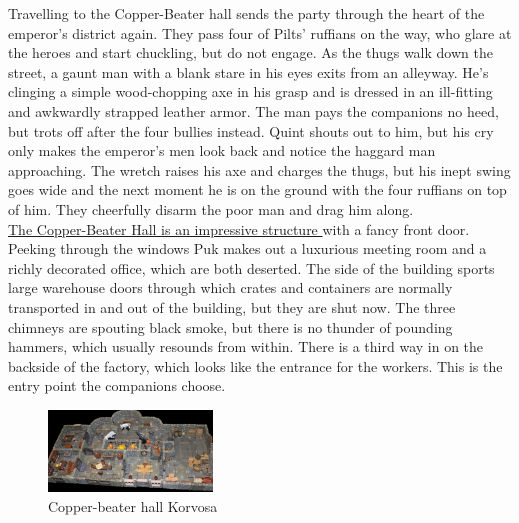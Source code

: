 Travelling to the Copper-Beater hall sends the party through the heart of the emperor's district again. They pass four of Pilts' ruffians on the way, who glare at the heroes and start chuckling, but do not engage. As the thugs walk down the street, a gaunt man with a blank stare in his eyes exits from an alleyway. He's clinging a simple wood-chopping axe in his grasp and is dressed in an ill-fitting and awkwardly strapped leather armor. The man pays the companions no heed, but trots off after the four bullies instead. Quint shouts out to him, but his cry only makes the emperor's men look back and notice the haggard man approaching. The wretch raises his axe and charges the thugs, but his inept swing goes wide and the next moment he is on the ground with the four ruffians on top of him. They cheerfully disarm the poor man and drag him along.\\

\hyperref[fig:Copper-beater-hall-Korvosa-555420262]{ The Copper-Beater Hall is an impressive structure } with a fancy front door. Peeking through the windows Puk makes out a luxurious meeting room and a richly decorated office, which are both deserted. The side of the building sports large warehouse doors through which crates and containers are normally transported in and out of the building, but they are shut now. The three chimneys are spouting black smoke, but there is no thunder of pounding hammers, which usually resounds from within. There is a third way in on the backside of the factory, which looks like the entrance for the workers. This is the entry point the companions choose. \\

\begin{figure}[h]
	\centering
	\includegraphics[width=0.39\textwidth]{images/Copper-beater-hall-Korvosa-555420262.jpg}
	\caption{Copper-beater hall Korvosa}
	\label{fig:Copper-beater-hall-Korvosa-555420262}
\end{figure}

